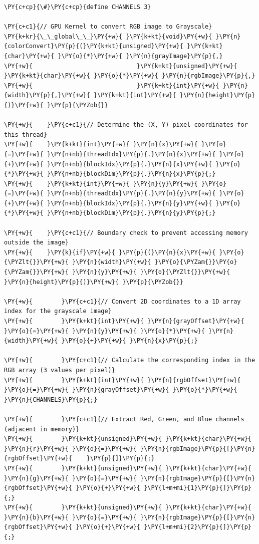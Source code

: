 \begin{Verbatim}[label=\makebox{\url{https://github.com/lucabaldini/cmepda/tree/master/slides/latex/snippets/cuda_rgb_to_grayscale.cu}},commandchars=\\\{\}]
\PY{c+cp}{\#}\PY{c+cp}{define CHANNELS 3}

\PY{c+c1}{// GPU Kernel to convert RGB image to Grayscale}
\PY{k+kr}{\_\_global\_\_}\PY{+w}{ }\PY{k+kt}{void}\PY{+w}{ }\PY{n}{colorConvert}\PY{p}{(}\PY{k+kt}{unsigned}\PY{+w}{ }\PY{k+kt}{char}\PY{+w}{ }\PY{o}{*}\PY{+w}{ }\PY{n}{grayImage}\PY{p}{,}
\PY{+w}{                             }\PY{k+kt}{unsigned}\PY{+w}{ }\PY{k+kt}{char}\PY{+w}{ }\PY{o}{*}\PY{+w}{ }\PY{n}{rgbImage}\PY{p}{,}
\PY{+w}{                             }\PY{k+kt}{int}\PY{+w}{ }\PY{n}{width}\PY{p}{,}\PY{+w}{ }\PY{k+kt}{int}\PY{+w}{ }\PY{n}{height}\PY{p}{)}\PY{+w}{ }\PY{p}{\PYZob{}}

\PY{+w}{    }\PY{c+c1}{// Determine the (X, Y) pixel coordinates for this thread}
\PY{+w}{    }\PY{k+kt}{int}\PY{+w}{ }\PY{n}{x}\PY{+w}{ }\PY{o}{=}\PY{+w}{ }\PY{n+nb}{threadIdx}\PY{p}{.}\PY{n}{x}\PY{+w}{ }\PY{o}{+}\PY{+w}{ }\PY{n+nb}{blockIdx}\PY{p}{.}\PY{n}{x}\PY{+w}{ }\PY{o}{*}\PY{+w}{ }\PY{n+nb}{blockDim}\PY{p}{.}\PY{n}{x}\PY{p}{;}
\PY{+w}{    }\PY{k+kt}{int}\PY{+w}{ }\PY{n}{y}\PY{+w}{ }\PY{o}{=}\PY{+w}{ }\PY{n+nb}{threadIdx}\PY{p}{.}\PY{n}{y}\PY{+w}{ }\PY{o}{+}\PY{+w}{ }\PY{n+nb}{blockIdx}\PY{p}{.}\PY{n}{y}\PY{+w}{ }\PY{o}{*}\PY{+w}{ }\PY{n+nb}{blockDim}\PY{p}{.}\PY{n}{y}\PY{p}{;}

\PY{+w}{    }\PY{c+c1}{// Boundary check to prevent accessing memory outside the image}
\PY{+w}{    }\PY{k}{if}\PY{+w}{ }\PY{p}{(}\PY{n}{x}\PY{+w}{ }\PY{o}{\PYZlt{}}\PY{+w}{ }\PY{n}{width}\PY{+w}{ }\PY{o}{\PYZam{}}\PY{o}{\PYZam{}}\PY{+w}{ }\PY{n}{y}\PY{+w}{ }\PY{o}{\PYZlt{}}\PY{+w}{ }\PY{n}{height}\PY{p}{)}\PY{+w}{ }\PY{p}{\PYZob{}}

\PY{+w}{        }\PY{c+c1}{// Convert 2D coordinates to a 1D array index for the grayscale image}
\PY{+w}{        }\PY{k+kt}{int}\PY{+w}{ }\PY{n}{grayOffset}\PY{+w}{ }\PY{o}{=}\PY{+w}{ }\PY{n}{y}\PY{+w}{ }\PY{o}{*}\PY{+w}{ }\PY{n}{width}\PY{+w}{ }\PY{o}{+}\PY{+w}{ }\PY{n}{x}\PY{p}{;}

\PY{+w}{        }\PY{c+c1}{// Calculate the corresponding index in the RGB array (3 values per pixel)}
\PY{+w}{        }\PY{k+kt}{int}\PY{+w}{ }\PY{n}{rgbOffset}\PY{+w}{ }\PY{o}{=}\PY{+w}{ }\PY{n}{grayOffset}\PY{+w}{ }\PY{o}{*}\PY{+w}{ }\PY{n}{CHANNELS}\PY{p}{;}

\PY{+w}{        }\PY{c+c1}{// Extract Red, Green, and Blue channels (adjacent in memory)}
\PY{+w}{        }\PY{k+kt}{unsigned}\PY{+w}{ }\PY{k+kt}{char}\PY{+w}{ }\PY{n}{r}\PY{+w}{ }\PY{o}{=}\PY{+w}{ }\PY{n}{rgbImage}\PY{p}{[}\PY{n}{rgbOffset}\PY{+w}{    }\PY{p}{]}\PY{p}{;}
\PY{+w}{        }\PY{k+kt}{unsigned}\PY{+w}{ }\PY{k+kt}{char}\PY{+w}{ }\PY{n}{g}\PY{+w}{ }\PY{o}{=}\PY{+w}{ }\PY{n}{rgbImage}\PY{p}{[}\PY{n}{rgbOffset}\PY{+w}{ }\PY{o}{+}\PY{+w}{ }\PY{l+m+mi}{1}\PY{p}{]}\PY{p}{;}
\PY{+w}{        }\PY{k+kt}{unsigned}\PY{+w}{ }\PY{k+kt}{char}\PY{+w}{ }\PY{n}{b}\PY{+w}{ }\PY{o}{=}\PY{+w}{ }\PY{n}{rgbImage}\PY{p}{[}\PY{n}{rgbOffset}\PY{+w}{ }\PY{o}{+}\PY{+w}{ }\PY{l+m+mi}{2}\PY{p}{]}\PY{p}{;}


\end{Verbatim}
